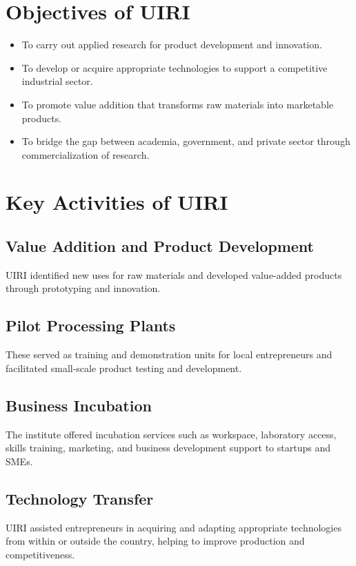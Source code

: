 \documentclass[12pt,a4paper]{report}
\begin{document}
\section{Objectives of UIRI}
\begin{itemize}
    \item To carry out applied research for product development and innovation.
    \item To develop or acquire appropriate technologies to support a competitive industrial sector.
    \item To promote value addition that transforms raw materials into marketable products.
    \item To bridge the gap between academia, government, and private sector through commercialization of research.
\end{itemize}

\section{Key Activities of UIRI}

\subsection{Value Addition and Product Development}
\noindent UIRI identified new uses for raw materials and developed value-added products through prototyping and innovation.

\subsection{Pilot Processing Plants}
\noindent These served as training and demonstration units for local entrepreneurs and facilitated small-scale product testing and development.

\subsection{Business Incubation}
\noindent The institute offered incubation services such as workspace, laboratory access, skills training, marketing, and business development support to startups and SMEs.

\subsection{Technology Transfer}
\noindent UIRI assisted entrepreneurs in acquiring and adapting appropriate technologies from within or outside the country, helping to improve production and competitiveness.
\end{document}
